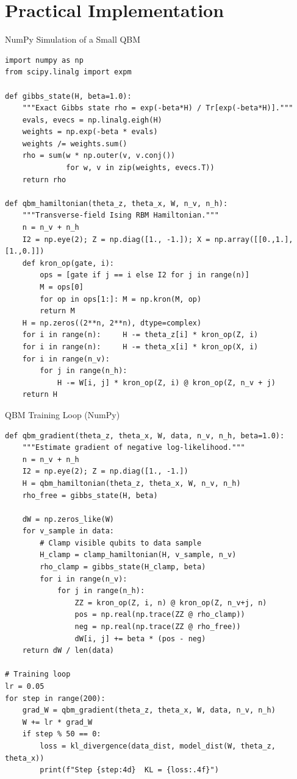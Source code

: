 \documentclass[aspectratio=169,10pt]{beamer}
\begin{document}
\section{Practical Implementation}

\begin{frame}[fragile]{NumPy Simulation of a Small QBM}
  \begin{lstlisting}
import numpy as np
from scipy.linalg import expm

def gibbs_state(H, beta=1.0):
    """Exact Gibbs state rho = exp(-beta*H) / Tr[exp(-beta*H)]."""
    evals, evecs = np.linalg.eigh(H)
    weights = np.exp(-beta * evals)
    weights /= weights.sum()
    rho = sum(w * np.outer(v, v.conj())
              for w, v in zip(weights, evecs.T))
    return rho

def qbm_hamiltonian(theta_z, theta_x, W, n_v, n_h):
    """Transverse-field Ising RBM Hamiltonian."""
    n = n_v + n_h
    I2 = np.eye(2); Z = np.diag([1., -1.]); X = np.array([[0.,1.],[1.,0.]])
    def kron_op(gate, i):
        ops = [gate if j == i else I2 for j in range(n)]
        M = ops[0]
        for op in ops[1:]: M = np.kron(M, op)
        return M
    H = np.zeros((2**n, 2**n), dtype=complex)
    for i in range(n):     H -= theta_z[i] * kron_op(Z, i)
    for i in range(n):     H -= theta_x[i] * kron_op(X, i)
    for i in range(n_v):
        for j in range(n_h):
            H -= W[i, j] * kron_op(Z, i) @ kron_op(Z, n_v + j)
    return H
  \end{lstlisting}
\end{frame}

\begin{frame}[fragile]{QBM Training Loop (NumPy)}
  \begin{lstlisting}
def qbm_gradient(theta_z, theta_x, W, data, n_v, n_h, beta=1.0):
    """Estimate gradient of negative log-likelihood."""
    n = n_v + n_h
    I2 = np.eye(2); Z = np.diag([1., -1.])
    H = qbm_hamiltonian(theta_z, theta_x, W, n_v, n_h)
    rho_free = gibbs_state(H, beta)

    dW = np.zeros_like(W)
    for v_sample in data:
        # Clamp visible qubits to data sample
        H_clamp = clamp_hamiltonian(H, v_sample, n_v)
        rho_clamp = gibbs_state(H_clamp, beta)
        for i in range(n_v):
            for j in range(n_h):
                ZZ = kron_op(Z, i, n) @ kron_op(Z, n_v+j, n)
                pos = np.real(np.trace(ZZ @ rho_clamp))
                neg = np.real(np.trace(ZZ @ rho_free))
                dW[i, j] += beta * (pos - neg)
    return dW / len(data)

# Training loop
lr = 0.05
for step in range(200):
    grad_W = qbm_gradient(theta_z, theta_x, W, data, n_v, n_h)
    W += lr * grad_W
    if step % 50 == 0:
        loss = kl_divergence(data_dist, model_dist(W, theta_z, theta_x))
        print(f"Step {step:4d}  KL = {loss:.4f}")
  \end{lstlisting}
\end{frame}
\end{document}
